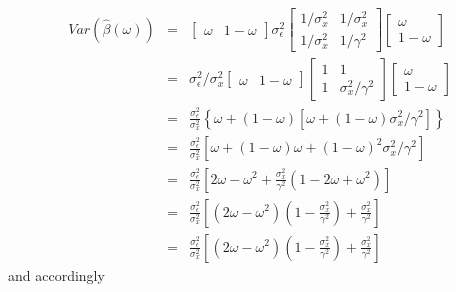 \documentclass[12pt]{article}
\theoremstyle{definition}
\begin{document}
  \begin{eqnarray*}
    Var\left(\widehat{\beta}(\omega)\right) &=& 
      \left[ \begin{array}{cc}
        \omega & 1-\omega
      \end{array}\right]
       \sigma_\epsilon^2 \left[
      \begin{array}{cc}
       1/\sigma_x^2 & 1/\sigma_x^2 \\
       1/\sigma_x^2 & 1/\gamma^2 
      \end{array}\right]\left[
      \begin{array}{c}
          \omega \\ 1- \omega
      \end{array}\right]\\
      &=& \sigma_\epsilon^2/\sigma_x^2 
      \left[ \begin{array}{cc}
        \omega & 1-\omega
      \end{array}\right]
          \left[\begin{array}{cc} 
          1& 1\\ 1& \sigma_x^2/\gamma^2
          \end{array} \right]
      \left[
      \begin{array}{c}
          \omega \\ 1- \omega
      \end{array}\right]\\
        &=&\frac{\sigma_\epsilon^2}{\sigma_x^2}\left\{ \omega + (1- \omega)\left[\omega + (1-\omega)\sigma_x^2/\gamma^2 \right]\right\} \\
        &=&\frac{\sigma_\epsilon^2}{\sigma_x^2}\left[ \omega + (1- \omega)\omega + (1-\omega)^2\sigma_x^2/\gamma^2 \right] \\
          &=& \frac{\sigma_\epsilon^2}{\sigma_x^2}\left[2\omega - \omega^2 + \frac{\sigma_x^2}{\gamma^2} \left(1 - 2\omega + \omega^2 \right) \right]\\
          &=& \frac{\sigma_\epsilon^2}{\sigma_x^2} \left[(2\omega - \omega^2)\left( 1 - \frac{\sigma_x^2}{\gamma^2}\right)+\frac{\sigma_x^2}{\gamma^2} \right]\\
          &=& \frac{\sigma_\epsilon^2}{\sigma_x^2} \left[(2\omega - \omega^2)\left( 1 - \frac{\sigma_x^2}{\gamma^2}\right)+\frac{\sigma_x^2}{\gamma^2} \right]
  \end{eqnarray*}
  and accordingly
\end{document}
